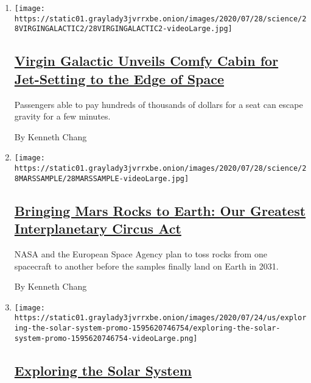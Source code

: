 \begin{enumerate}
\def\labelenumi{\arabic{enumi}.}
\item
  \texttt{[image: https://static01.graylady3jvrrxbe.onion/images/2020/07/28/science/28VIRGINGALACTIC2/28VIRGINGALACTIC2-videoLarge.jpg]}

  \hypertarget{virgin-galactic-unveils-comfy-cabin-for-jet-setting-to-the-edge-of-space}{%
  \subsection{\texorpdfstring{\href{/2020/07/28/science/virgin-galactic-cabin.html}{Virgin
  Galactic Unveils Comfy Cabin for Jet-Setting to the Edge of
  Space}}{Virgin Galactic Unveils Comfy Cabin for Jet-Setting to the Edge of Space}}\label{virgin-galactic-unveils-comfy-cabin-for-jet-setting-to-the-edge-of-space}}

  Passengers able to pay hundreds of thousands of dollars for a seat can
  escape gravity for a few minutes.

  By Kenneth Chang
\item
  \texttt{[image: https://static01.graylady3jvrrxbe.onion/images/2020/07/28/science/28MARSSAMPLE/28MARSSAMPLE-videoLarge.jpg]}

  \hypertarget{bringing-mars-rocks-to-earth-our-greatest-interplanetary-circus-act}{%
  \subsection{\texorpdfstring{\href{/2020/07/28/science/mars-sample-return-mission.html}{Bringing
  Mars Rocks to Earth: Our Greatest Interplanetary Circus
  Act}}{Bringing Mars Rocks to Earth: Our Greatest Interplanetary Circus Act}}\label{bringing-mars-rocks-to-earth-our-greatest-interplanetary-circus-act}}

  NASA and the European Space Agency plan to toss rocks from one
  spacecraft to another before the samples finally land on Earth in
  2031.

  By Kenneth Chang
\item
  \texttt{[image: https://static01.graylady3jvrrxbe.onion/images/2020/07/24/us/exploring-the-solar-system-promo-1595620746754/exploring-the-solar-system-promo-1595620746754-videoLarge.png]}

  \hypertarget{exploring-the-solar-system}{%
  \subsection{\texorpdfstring{\href{/interactive/2020/science/exploring-the-solar-system.html}{Exploring
  the Solar
  System}}{Exploring the Solar System}}\label{exploring-the-solar-system}}


\end{enumerate}
